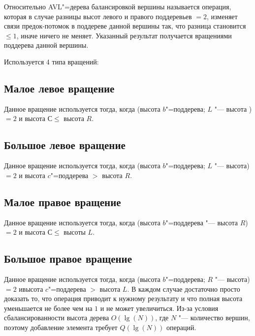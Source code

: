 Относительно AVL"=дерева балансировкой вершины называется операция,
которая в случае разницы высот левого и правого поддеревьев $= 2$,
изменяет связи предок-потомок в поддереве данной вершины так,
что разница становится $ \leqslant 1$, иначе ничего не меняет.
Указанный результат получается вращениями поддерева данной вершины.

Используется 4 типа вращений:

\subsection*{Малое левое вращение}


Данное вращение используется тогда,
когда (высота $b$"=поддерева; $L$ "--- высота )
$= 2$ и высота $С \leqslant$ высота $R$.

\subsection*{Большое левое вращение}


Данное вращение используется тогда,
когда (высота $b$"=поддерева; $L$ "--- высота)
$= 2$ и высота $c$"=поддерева $>$ высота $R$.

\subsection*{Малое правое вращение}


Данное вращение используется тогда,
когда (высота $b$"=поддерева "--- высота $R$)
$= 2$ и высота $С \leqslant $ высоты $L$.

\subsection*{Большое правое вращение}


Данное вращение используется тогда, когда (высота $b$"=поддерева; $R$ "--- высота)
$= 2$ ивысота $c$"=поддерева $ > $ высота $L$.
В каждом случае достаточно просто доказать то, 
что операция приводит к нужному результату и
что полная высота уменьшается не более чем на $1$ и не может увеличиться.
Из-за условия сбалансированности высота дерева $O(\lg(N))$,
где $N$ "--- количество вершин, поэтому добавление элемента требует $Q(\lg(N))$ операций.